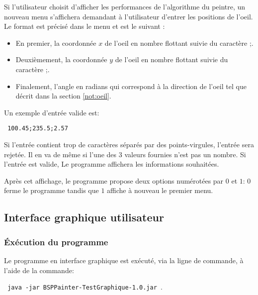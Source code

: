Si l'utilisateur choisit d'afficher les performances de l'algorithme
du peintre, un nouveau menu s'affichera demandant à l'utilisateur
d'entrer les positions de l'oeil. Le format est précisé
dans le menu et est le suivant :
\begin{itemize}
\item En premier, la coordonnée $x$ de l'oeil en nombre
  flottant suivie du caractère \og;\fg{}.
\item Deuxièmement, la coordonnée $y$ de l'oeil en
  nombre flottant suivie du caractère \og;\fg.
\item Finalement, l'angle en radians qui correspond à la direction
  de l'oeil tel que décrit dans la section \ref{not:oeil}.
\end{itemize}
Un exemple d'entrée valide est:
\begin{center}
  \texttt{
    100.45;235.5;2.57
  }
\end{center}

Si l'entrée contient trop de caractères séparés par des points-virgules,
l'entrée sera rejetée. Il en va de même si l'une des 3 valeurs fournies
n'est pas un nombre. Si l'entrée est valide,
Le programme affichera les informations souhaitées.

Après cet affichage, le programme propose deux options numérotées par
$0$ et $1$: $0$ ferme le programme tandis que $1$ affiche à nouveau
le premier menu.

\subsection{Interface graphique utilisateur}
\subsubsection*{\'Exécution du programme}
Le programme en interface graphique est exécuté, via la ligne de commande,
à l'aide de la commande:
\begin{center}
  \texttt{
    java -jar BSPPainter-TestGraphique-1.0.jar
  }.
\end{center}

